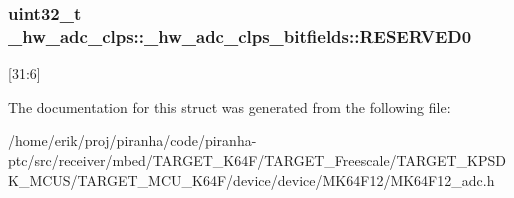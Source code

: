 \subsubsection[{\texorpdfstring{R\+E\+S\+E\+R\+V\+E\+D0}{RESERVED0}}]{\setlength{\rightskip}{0pt plus 5cm}uint32\+\_\+t \+\_\+hw\+\_\+adc\+\_\+clps\+::\+\_\+hw\+\_\+adc\+\_\+clps\+\_\+bitfields\+::\+R\+E\+S\+E\+R\+V\+E\+D0}\hypertarget{struct__hw__adc__clps_1_1__hw__adc__clps__bitfields_af941cd34fcae767e5e25f7fbaa09ab31}{}\label{struct__hw__adc__clps_1_1__hw__adc__clps__bitfields_af941cd34fcae767e5e25f7fbaa09ab31}
\mbox{[}31\+:6\mbox{]} 

The documentation for this struct was generated from the following file\+:\begin{DoxyCompactItemize}
\item 
/home/erik/proj/piranha/code/piranha-\/ptc/src/receiver/mbed/\+T\+A\+R\+G\+E\+T\+\_\+\+K64\+F/\+T\+A\+R\+G\+E\+T\+\_\+\+Freescale/\+T\+A\+R\+G\+E\+T\+\_\+\+K\+P\+S\+D\+K\+\_\+\+M\+C\+U\+S/\+T\+A\+R\+G\+E\+T\+\_\+\+M\+C\+U\+\_\+\+K64\+F/device/device/\+M\+K64\+F12/M\+K64\+F12\+\_\+adc.\+h\end{DoxyCompactItemize}
